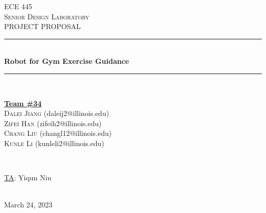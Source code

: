 \documentclass[12pt]{article}
\begin{document}
\begin{titlepage}
\newcommand{\HRule}{\rule{\linewidth}{0.1mm}} 
\center %
 
\textsc{\Large ECE 445}\\[0.5cm] %
\textsc{\large Senior Design Laboratory}\\[0.5cm] %
\textsc{\Large PROJECT PROPOSAL }\\[0.5cm] %

\HRule \\[0.5cm]
\huge \textbf{Robot for Gym Exercise Guidance} %
\HRule \\[2cm]
 
\begin{minipage}{0.5\textwidth}
    \begin{center} \large
        \underline{\textbf{Team \#34}} \\ \medskip
        \textsc{Dalei Jiang} (daleij2@illinois.edu) \\
        \textsc{Zifei Han} (zifeih2@illinois.edu) \\
        \textsc{Chang Liu} (changl12@illinois.edu) \\
        \textsc{Kunle Li} (kunleli2@illinois.edu) \\
    \end{center}
\end{minipage} \\[1.5cm]

\begin{minipage}{0.5\textwidth}
    \begin{center}
        \large
        \underline{TA}: Yiqun Niu
    \end{center}
\end{minipage} \\[1cm]

{\large March 24, 2023} %

\vfill %

\end{titlepage}
\clearpage
\tableofcontents
\newpage
\end{document}
